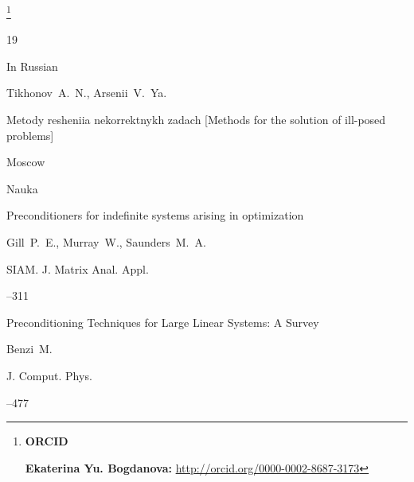 \thanks{{\bf ORCID}



{\bf  Ekaterina Yu. Bogdanova:}    \url{http://orcid.org/0000-0002-8687-3173}



}









\EngRef

\begin{thebibliography}{19}




\lang In Russian

\by Tikhonov~A.~N., Arsenii~V.~Ya.

\book Metody resheniia nekorrektnykh zadach \rm [Methods for the solution of ill-posed problems]

\publaddr Moscow

\publ Nauka







\paper Preconditioners for indefinite systems arising in optimization

\by Gill~P.~E., Murray~W., Saunders~M.~A.

\jour SIAM. J. Matrix Anal. Appl.




--311





\paper Preconditioning Techniques for Large Linear Systems: A Survey

\by Benzi~M.

\jour J. Comput. Phys.




–477






\end{thebibliography}
